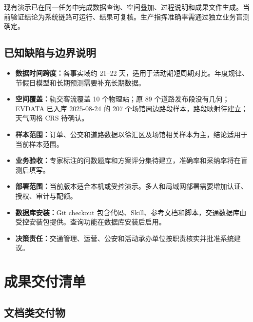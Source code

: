 \documentclass[a4paper,11pt]{article}
\newcommand{\term}[1]{\textbf{#1}}
\begin{document}
现有演示已在同一任务中完成数据查询、空间叠加、过程说明和成果文件生成。当前验证结论为系统链路可运行、结果可复核。生产指挥准确率需通过独立业务盲测确定。

\subsection{已知缺陷与边界说明}

\begin{itemize}
  \item \term{数据时间跨度：}各事实域约 21--22 天，适用于活动期短周期对比。年度规律、节假日模型和长期预测需要补充长期数据。
  \item \term{空间覆盖：}轨交客流覆盖 10 个物理站；原 89 个道路发布段没有几何；EVDATA 已入库 2025-08-24 的 207 个场馆周边路段样本，路段映射待建立；天气网格 CRS 待确认。
  \item \term{样本范围：}订单、公交和道路数据以徐汇区及场馆相关样本为主，结论适用于当前样本范围。
  \item \term{业务验收：}专家标注的问数题库和方案评分集待建立，准确率和采纳率将在盲测后填写。
  \item \term{部署范围：}当前版本适合本机或受控演示。多人和局域网部署需要增加认证、授权、审计与配额。
  \item \term{数据库安装：}Git checkout 包含代码、Skill、参考文档和脚本，交通数据库由受控安装包提供。查询功能在数据库安装后启用。
  \item \term{决策责任：}交通管理、运营、公安和活动承办单位按职责核实并批准系统建议。
\end{itemize}

\newpage
\section{成果交付清单}

\subsection{文档类交付物}
\end{document}

